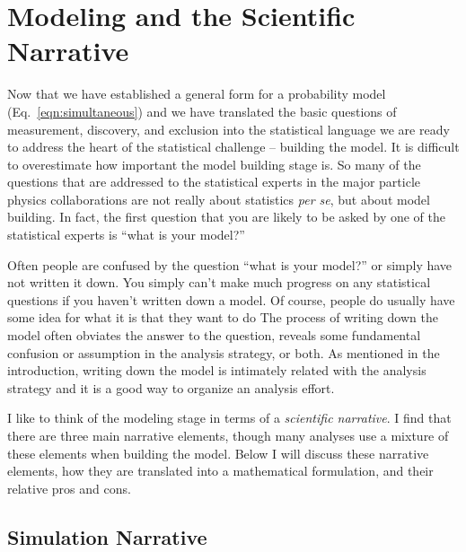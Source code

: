\section{Modeling and the Scientific Narrative}


Now that we have established a general form for a probability model (Eq.~\ref{eqn:simultaneous}) and we have translated the basic questions of measurement, discovery, and exclusion into the statistical language we are ready to address the heart of the statistical challenge -- building the model.  It is difficult to overestimate how important the model building stage is.  So many of the questions that are addressed to the statistical experts in the major particle physics collaborations are not really about statistics \textit{per se}, but about model building.  In fact, the first question that you are likely to be asked by one of the statistical experts is ``what is your model?'' 


Often people are confused by the question ``what is your model?'' or simply have not written it down.  You simply can't make much progress on any statistical questions if you haven't written down a model.  Of course, people do usually have some idea for what it is that they want to do The process of writing down the model often obviates the answer to the question, reveals some fundamental confusion or assumption in the analysis strategy, or both.  As mentioned in the introduction, writing down the model is intimately related with the analysis strategy and it is a good way to organize an analysis effort.


I like to think of the modeling stage in terms of a  \textit{scientific narrative}.  I find that there are three main narrative elements, though many analyses use a mixture of these elements when building the model.  Below I will discuss these narrative elements, how they are translated into a mathematical formulation, and their relative pros and cons.


\subsection{Simulation Narrative}


